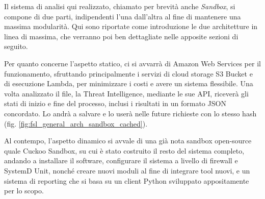 \bigskip

Il sistema di analisi qui realizzato, chiamato per brevità anche \emph{Sandbox},
si compone di due parti, indipendenti l'una dall'altra al fine di mantenere una massima modularità.
Qui sono riportate come introduzione le due architetture in linea di massima, che verranno poi ben dettagliate nelle apposite sezioni di seguito.

Per quanto concerne l'aspetto statico, ci si avvarrà di Amazon Web Services per il funzionamento,
sfruttando principalmente i servizi di cloud storage S3 Bucket e di esecuzione Lambda, per minimizzare i costi e avere un sistema flessibile.
Una volta analizzato il file, la Threat Intelligence, mediante le sue API, riceverà gli stati di inizio e fine del processo, inclusi i risultati in un formato JSON concordato. Lo andrà a salvare e lo userà nelle future richieste con lo stesso hash (fig. \ref{fig:fsl_general_arch_sandbox_cached}).

Al contempo, l'aspetto dinamico si avvale di una già nota sandbox open-source quale Cuckoo Sandbox,
su cui è stato costruito il resto del sistema completo,
andando a installare il software, configurare il sistema a livello di firewall e SystemD Unit,
nonché creare nuovi moduli al fine di integrare tool nuovi, e un sistema di reporting che si basa su un client Python sviluppato appositamente per lo scopo.

